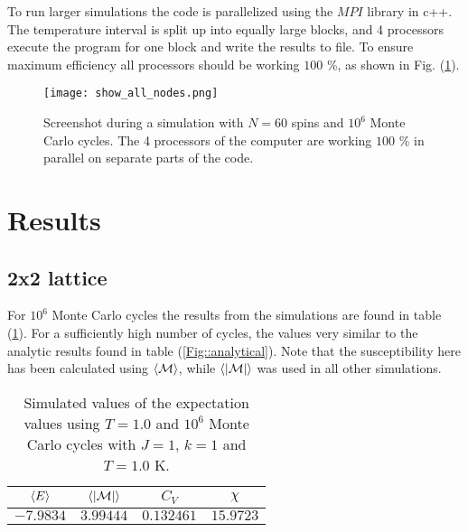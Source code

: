 \documentclass[11pt]{article}
\begin{document}
\begin{flushleft}
To run larger simulations the code is parallelized using the $MPI$ library in c++. The temperature interval is split up into equally large blocks, and 4 processors execute the program for one block and write the results to file. To ensure maximum efficiency all processors should be working $100$ \%, as shown in  Fig. (\ref{efficiency}).

\begin{figure}[H]
\centering
\texttt{[image: show\_all\_nodes.png]}
\caption{Screenshot during a simulation with $N=60$ spins and $10^6$ Monte Carlo cycles. The 4 processors of the computer are working 
$100$ \% in parallel on separate parts of the code.}
\label{efficiency}
\end{figure}



\end{flushleft}

\section*{Results}

\subsection*{2x2 lattice}

\begin{flushleft}
For $10^6$ Monte Carlo cycles the results from the simulations are found in table (\ref{Fig::values simulated}). For a sufficiently high number of cycles, the values very similar to the analytic results found in table (\ref{Fig::analytical}). Note that the susceptibility here has been calculated using $\braket{\mathcal{M}}$, while $\braket{|\mathcal{M}|}$ was used in all other simulations.



\begin{table}[H]
\centering
\begin{tabular}{|c|c|c|c|}
\hline
$\braket{E}$ & $\braket{|\mathcal{M}|}$ & $C_V$ & $\chi$\\
\hline
$-7.9834$ & $3.99444$ & $0.132461$ & $15.9723$\\
\hline
\end{tabular}
\caption{Simulated values of the expectation values using $T=1.0$ and $10^6$ Monte Carlo cycles with $J=1$, $k=1$ and $T=1.0$ K.}
\label{Fig::values simulated}
\end{table}

\end{flushleft}
\end{document}
